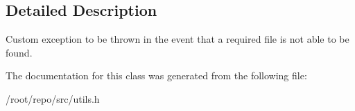 \subsection{Detailed Description}
Custom exception to be thrown in the event that a required file is not able to be found. 

The documentation for this class was generated from the following file\+:\begin{DoxyCompactItemize}
\item 
/root/repo/src/utils.\+h\end{DoxyCompactItemize}
